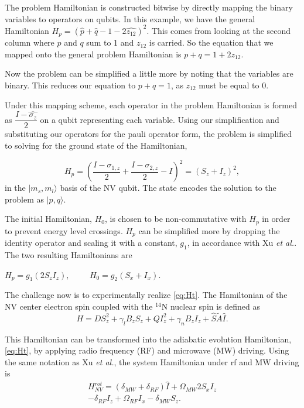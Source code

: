 \documentclass[%
 reprint,
 amsmath,amssymb,
 aps,
]{revtex4-1}
\begin{document}
	The problem Hamiltonian is constructed bitwise by directly mapping the binary variables to operators on qubits\cite{Xu2012}. In this example, we have the general Hamiltonian 
	$H_p = \left( \hat{p} + \hat{q} -1 -2\hat{z_{12}} \right)^2 $.
This comes from looking at the second column where $p$ and $q$ sum to 1 and $z_{12}$ is carried. So the equation that we mapped onto the general problem Hamiltonian is $p+q=1+2z_{12}$.

	
	 Now the problem can be simplified a little more by noting that the variables are binary. This reduces our equation to $p+q=1$, as $z_{12}$ must be equal to 0.	 
	 
	  Under this mapping scheme, each operator in the problem Hamiltonian is formed as $\dfrac{I-\hat{\sigma_z}}{2}$ on a qubit representing each variable. Using our simplification and substituting our operators for the pauli operator form, the problem is simplified to solving for the ground state of the Hamiltonian,
	
\begin{equation}
	H_p = \left( \dfrac{I-\sigma_{1,z}}{2} + \dfrac{I-\sigma_{2,z}}{2} - I\right)^2 = \left(S_z + I_z \right)^2 ,
\end{equation}
in the $\vert m_s,m_l \rangle$ basis of the NV qubit. The state encodes the solution to the problem as   $\vert p,q \rangle$.

	The initial Hamiltonian, $H_0$, is chosen to be non-commutative with $H_p$ in order to prevent energy level crossings. $H_p$ can be simplified more by dropping the identity operator and scaling it with a constant, $g_1$, in accordance with Xu \textit{et al.}. The two resulting Hamiltonians are

\begin{center}
	$H_p = g_1\left(2S_zI_z\right), \hspace{1cm} H_0 = g_2\left(S_x + I_x\right) $.
\end{center}

	The challenge now is to experimentally realize \ref{eq:Ht}. The Hamiltonian of the NV center electron spin coupled with the $^{14}$N nuclear spin is defined as
	\begin{equation}
		H = DS_z^2 + \gamma_lB_zS_z + QI_z^2 + \gamma_nB_zI_z + \hat{S}\tilde{A}\hat{I}.
	\end{equation}

	This Hamiltonian can be transformed into the adiabatic evolution Hamiltonian, \ref{eq:Ht}, by applying radio frequency (RF) and microwave (MW) driving\cite{Kong2016}. Using the same notation as Xu \textit{et al.}, the system Hamiltonian under rf and MW driving is
	\begin{equation}
	\begin{split}
		H^{rot}_{NV} = \left( \delta_{MW} + \delta_{RF} \right)\hat{I} + \Omega_{MW}2S_xI_z \\ - \delta_{RF}I_z + \Omega_{RF}I_x - \delta_{MW}S_z.
	\end{split}
	\label{eq:rotNV}
	\end{equation}
	
\end{document}
